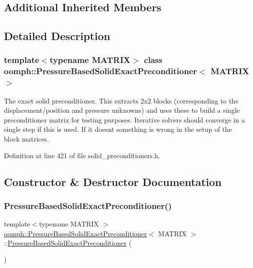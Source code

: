 \subsection*{Additional Inherited Members}


\subsection{Detailed Description}
\subsubsection*{template$<$typename M\+A\+T\+R\+IX$>$\newline
class oomph\+::\+Pressure\+Based\+Solid\+Exact\+Preconditioner$<$ M\+A\+T\+R\+I\+X $>$}

The exact solid preconditioner. This extracts 2x2 blocks (corresponding to the displacement/position and pressure unknowns) and uses these to build a single preconditioner matrix for testing purposes. Iterative solvers should converge in a single step if this is used. If it doesn\textquotesingle{}t something is wrong in the setup of the block matrices. 

Definition at line 421 of file solid\+\_\+preconditioners.\+h.



\subsection{Constructor \& Destructor Documentation}
\mbox{\label{classoomph_1_1PressureBasedSolidExactPreconditioner_a073924e293fc44655b5d2d11fbe18c56}} 
\subsubsection{\texorpdfstring{Pressure\+Based\+Solid\+Exact\+Preconditioner()}{PressureBasedSolidExactPreconditioner()}\hspace{0.1cm}{\footnotesize\ttfamily [1/2]}}
{\footnotesize\ttfamily template$<$typename M\+A\+T\+R\+IX $>$ \\
\hyperlink{classoomph_1_1PressureBasedSolidExactPreconditioner}{oomph\+::\+Pressure\+Based\+Solid\+Exact\+Preconditioner}$<$ M\+A\+T\+R\+IX $>$\+::\hyperlink{classoomph_1_1PressureBasedSolidExactPreconditioner}{Pressure\+Based\+Solid\+Exact\+Preconditioner} (\begin{DoxyParamCaption}{ }\end{DoxyParamCaption})\hspace{0.3cm}{\ttfamily [inline]}}



